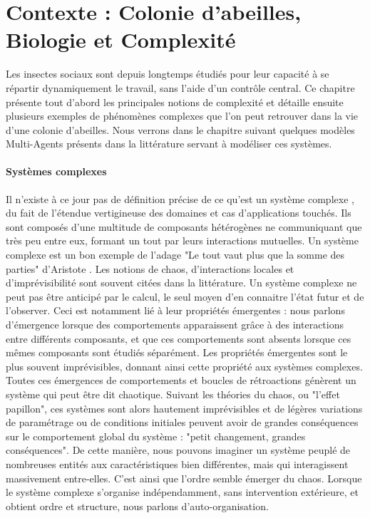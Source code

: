 \chapter*{Contexte : Colonie d'abeilles, Biologie et Complexité}
	\label{sectionBio}
	
	Les insectes sociaux sont depuis longtemps étudiés pour leur capacité à se répartir dynamiquement le travail, sans l'aide d'un contrôle central. Ce chapitre présente tout d'abord les principales notions de complexité et détaille ensuite plusieurs exemples de phénomènes complexes que l'on peut retrouver dans la vie d'une colonie d'abeilles. Nous verrons dans le chapitre suivant quelques modèles Multi-Agents présents dans la littérature servant à modéliser ces systèmes.

	
		\subsubsection{Systèmes complexes}
		
			Il n'existe à ce jour pas de définition précise de ce qu'est un système complexe \cite{heylighen_complexity_2008}, du fait de l'étendue vertigineuse des domaines et cas d'applications touchés. Ils sont composés d'une multitude de composants hétérogènes ne communiquant que très peu entre eux, formant un tout par leurs interactions mutuelles. Un système complexe est un bon exemple de l'adage "Le tout vaut plus que la somme des parties" d'Aristote \cite{edmonds_what_1999}. Les notions de chaos, d'interactions locales et d'imprévisibilité sont souvent citées dans la littérature. Un système complexe ne peut pas être anticipé par le calcul, le seul moyen d'en connaitre l'état futur et de l'observer. 
			Ceci est notamment lié à leur propriétés émergentes : nous parlons d'émergence lorsque des comportements apparaissent grâce à des interactions entre différents composants, et que ces comportements sont absents lorsque ces mêmes composants sont étudiés séparément. Les propriétés émergentes sont le plus souvent imprévisibles, donnant ainsi cette propriété aux systèmes complexes. Toutes ces émergences de comportements et boucles de rétroactions génèrent un système qui peut être dit chaotique. 
			Suivant les théories du chaos, ou "l'effet papillon", ces systèmes sont alors hautement imprévisibles et de légères variations de paramétrage ou de conditions initiales peuvent avoir de grandes conséquences sur le comportement global du système : "petit changement, grandes conséquences". De cette manière, nous pouvons imaginer un système peuplé de nombreuses entités aux caractéristiques bien différentes, mais qui interagissent massivement entre-elles. C'est ainsi que l'ordre semble émerger du chaos. Lorsque le système complexe s'organise indépendamment, sans intervention extérieure, et obtient ordre et structure, nous parlons d'auto-organisation.
			
